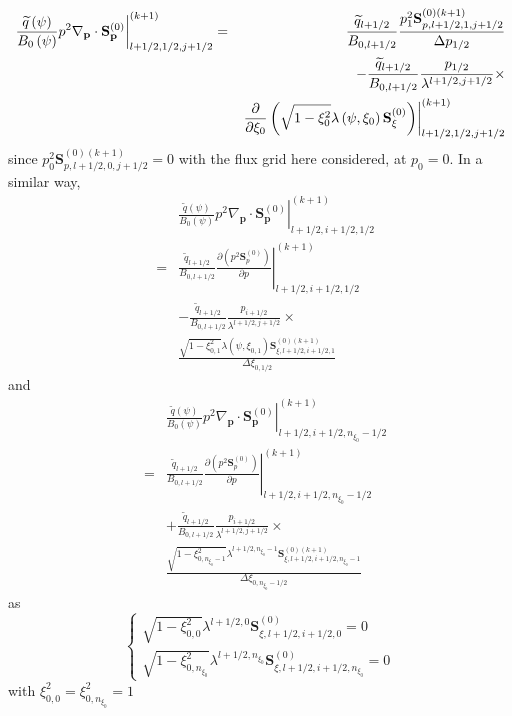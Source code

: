 \begin{eqnarray}
\left. \frac{\widetilde{q}\left( \psi \right) }{B_{0}\left( \psi \right) }%
p^{2}\nabla _{\mathbf{p}}\cdot \mathbf{S}_{\mathbf{p}}^{\left( 0\right)
}\right| _{l+1/2,1/2,j+1/2}^{(k+1)} &=&\frac{\widetilde{q}_{l+1/2}}{%
B_{0,l+1/2}}\frac{p_{1}^{2}\mathbf{S}_{p,l+1/2,1,j+1/2}^{\left( 0\right)
(k+1)}}{\Delta p_{1/2}}  \nonumber \\
&&-\frac{\widetilde{q}_{l+1/2}}{B_{0,l+1/2}}\frac{p_{1/2}}{\lambda
^{l+1/2,j+1/2}}\times   \nonumber \\
&&\left. \frac{\partial }{\partial \xi _{0}}\left( \sqrt{1-\xi _{0}^{2}}%
\lambda \left( \psi ,\xi _{0}\right) \mathbf{S}_{\xi }^{\left( 0\right)
}\right) \right| _{l+1/2,1/2,j+1/2}^{(k+1)}  \label{boundary_p}
\end{eqnarray}
since $p_{0}^{2}\mathbf{S}_{p,l+1/2,0,j+1/2}^{\left( 0\right) (k+1)}=0$ with
the flux grid here considered, at $p_{0}=0$. In a similar way,
\begin{eqnarray}
&&\left. \frac{\widetilde{q}\left( \psi \right) }{B_{0}\left( \psi \right) }%
p^{2}\nabla _{\mathbf{p}}\cdot \mathbf{S}_{\mathbf{p}}^{\left( 0\right)
}\right| _{l+1/2,i+1/2,1/2}^{(k+1)}  \nonumber \\
&=&\frac{\widetilde{q}_{l+1/2}}{B_{0,l+1/2}}\left. \frac{\partial \left(
p^{2}\mathbf{S}_{p}^{\left( 0\right) }\right) }{\partial p}\right|
_{l+1/2,i+1/2,1/2}^{(k+1)} \\
&&-\frac{\widetilde{q}_{l+1/2}}{B_{0,l+1/2}}\frac{p_{i+1/2}}{\lambda
^{l+1/2,j+1/2}}\times   \nonumber \\
&&\frac{\sqrt{1-\xi _{0,1}^{2}}\lambda \left( \psi ,\xi _{0,1}\right)
\mathbf{S}_{\xi ,l+1/2,i+1/2,1}^{\left( 0\right) (k+1)}}{\Delta \xi _{0,1/2}}
\end{eqnarray}
and
\begin{eqnarray}
&&\left. \frac{\widetilde{q}\left( \psi \right) }{B_{0}\left( \psi \right) }%
p^{2}\nabla _{\mathbf{p}}\cdot \mathbf{S}_{\mathbf{p}}^{\left( 0\right)
}\right| _{l+1/2,i+1/2,n_{\xi _{0}}-1/2}^{(k+1)}  \nonumber \\
&=&\frac{\widetilde{q}_{l+1/2}}{B_{0,l+1/2}}\left. \frac{\partial \left(
p^{2}\mathbf{S}_{p}^{\left( 0\right) }\right) }{\partial p}\right|
_{l+1/2,i+1/2,n_{\xi _{0}}-1/2}^{(k+1)}  \nonumber \\
&&+\frac{\widetilde{q}_{l+1/2}}{B_{0,l+1/2}}\frac{p_{i+1/2}}{\lambda
^{l+1/2,j+1/2}}\times   \nonumber \\
&&\frac{\sqrt{1-\xi _{0,n_{\xi _{0}}-1}^{2}}\lambda ^{l+1/2,n_{\xi _{0}}-1}%
\mathbf{S}_{\xi ,l+1/2,i+1/2,n_{\xi _{0}}-1}^{\left( 0\right) (k+1)}}{\Delta %
\xi _{0,n_{\xi _{0}}-1/2}}
\end{eqnarray}
as
\begin{equation}
\left\{
\begin{array}{l}
\sqrt{1-\xi _{0,0}^{2}}\lambda ^{l+1/2,0}\mathbf{S}_{\xi
,l+1/2,i+1/2,0}^{\left( 0\right) }=0 \\
\sqrt{1-\xi _{0,n_{\xi _{0}}}^{2}}\lambda ^{l+1/2,n_{\xi _{0}}}\mathbf{S}%
_{\xi ,l+1/2,i+1/2,n_{\xi _{0}}}^{\left( 0\right) }=0
\end{array}
\right.
\end{equation}
with $\xi _{0,0}^{2}=\xi _{0,n_{\xi _{0}}}^{2}=1$

